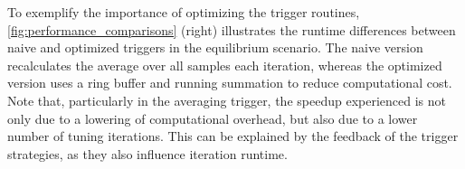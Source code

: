 To exemplify the importance of optimizing the trigger routines, \autoref{fig:performance_comparisons} (right) illustrates the runtime differences between naive and optimized triggers in the equilibrium scenario. The naive version recalculates the average over all samples each iteration, whereas the optimized version uses a ring buffer and running summation to reduce computational cost. Note that, particularly in the averaging trigger, the speedup experienced is not only due to a lowering of computational overhead, but also due to a lower number of tuning iterations. This can be explained by the feedback of the trigger strategies, as they also influence iteration runtime.

